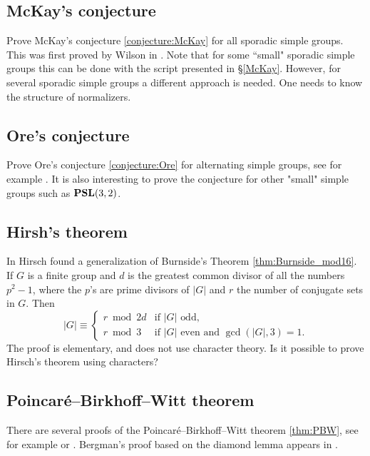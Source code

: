 \subsection*{McKay's conjecture}

Prove McKay's conjecture \ref{conjecture:McKay} for all sporadic simple groups. 
This was first proved by Wilson in \cite{MR1643110}. 
Note that
for some ``small" sporadic simple groups this can be done
with the script presented in \S\ref{McKay}. However, 
for several sporadic simple groups a different approach is needed. One needs
to know the structure of normalizers. 

\subsection*{Ore's conjecture}

Prove Ore's conjecture \ref{conjecture:Ore} for alternating simple groups,
see for example \cite{MR40298}. It is also interesting to prove the conjecture
for other "small" simple groups such as $\mathbf{PSL}(3,2)$.  



\subsection*{Hirsh's theorem}

In \cite{MR36755} Hirsch found a generalization of Burnside's Theorem \ref{thm:Burnside_mod16}.  
If $G$ is a finite group and $d$ is the greatest common divisor of all 
the numbers $p^2-1$, where the $p$'s are prime divisors of $|G|$ and $r$ the number of conjugate sets in $G$. Then 
\[
|G|\equiv\begin{cases} 
    r\bmod 2d &\text{if $|G|$ odd,}\\
    r\bmod 3 & \text{if $|G|$ even and $\gcd(|G|,3)=1$.}
    \end{cases}
\]
The proof is elementary, and does not use character theory. Is it possible
to prove Hirsch's theorem using characters?


\subsection*{Poincar\'e--Birkhoff--Witt theorem}

There are several proofs of the
Poincar\'e--Birkhoff--Witt theorem \ref{thm:PBW}, see for example 
\cite[\S17.4]{MR499562} or \cite[Theorem 2.17]{MR938524}. 
Bergman's proof based on the diamond lemma 
appears in \cite{MR506890}. 

